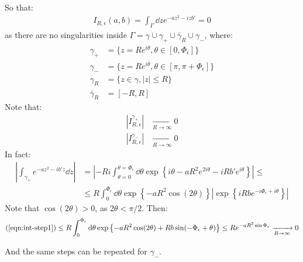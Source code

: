 \documentclass[../template.tex]{subfiles}
\begin{document}
\begin{example}
\begin{enumerate}
        So that:
        \begin{align*}
            I_{R,\epsilon} (a,b) = \int_\Gamma \dd{z} e^{-a z^2 - iz b'} = 0
        \end{align*}
        as there are no singularities inside $\Gamma = \gamma \cup \gamma_+ \cup \bar{\gamma}_R \cup \gamma_-$, where:
        \begin{align*}
            \gamma_+ &= \{ z = Re^{i \theta}, \theta \in [0, \Phi_\epsilon]\}\\
            \gamma_- &= \{z = Re^{i \theta}, \theta \in [\pi, \pi + \Phi_\epsilon]\}\\
            \gamma_R &= \{z \in \gamma, |z| \leq R\}\\
            \bar{\gamma}_R &= [-R, R]
        \end{align*} 
        Note that:
        \begin{align*}
            \left|I^{\gamma_+}_{R,\epsilon}\right|  &\xrightarrow[R \to \infty]{}  0\\
            \left|I_{R,\epsilon}^{\gamma_-}\right| & \xrightarrow[R \to \infty]{}  0
        \end{align*}
        In fact:
        \begin{align} \nonumber
            \left|\int_{\gamma_+} e^{-az^2 - ib'z} \dd{z} \right| &= \left| -Ri \int_{\theta = 0}^{\theta= \Phi_\epsilon}\dd{\theta} \exp\left\{i \theta - a R^2 e^{2i \theta} - i R b' e^{i \theta}\right\}
            \right| \leq\\
            & \leq R \int_{0}^{\Phi_\epsilon} \dd{\theta} \exp\left\{ 
            -aR^2 \cos(2 \theta)
            \right\} \left|\exp\left\{ iR b e^{-i \Phi_\epsilon + i \theta}\right \} \right|
            \label{eqn:int-step1}
        \end{align}
        Note that $\cos(2 \theta) >0$, as $2 \theta < \pi/2$. Then:
        \begin{align*}
            (\ref{eqn:int-step1}) \leq R \int_{0}^{\Phi_\epsilon} \dd{\theta} \exp\left \{
            -aR^2 \cos(2 \theta) + Rb \sin(-\Phi_\epsilon + \theta)
            \right\} \leq R e^{-a R^2 \sin \Phi_\epsilon}  \xrightarrow[R \to \infty]{}  0
        \end{align*}  
    
    And the same steps can be repeated for $\gamma_-$.\\
    

\end{enumerate}
\end{example}
\end{document}
